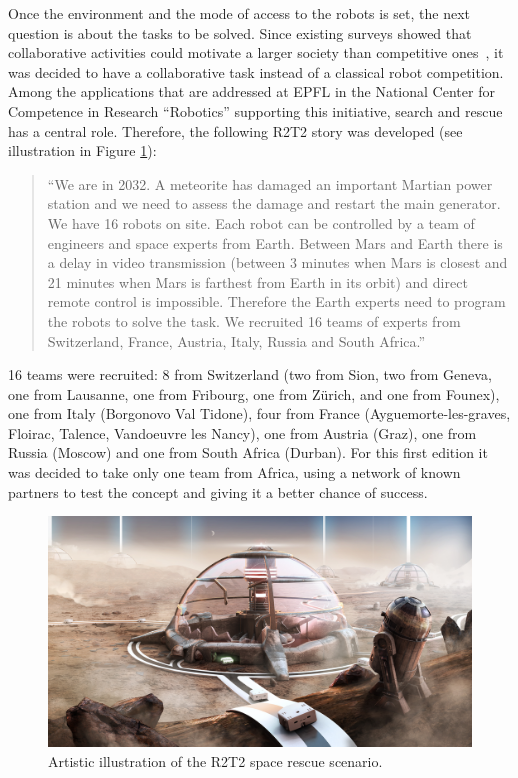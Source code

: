 \documentclass{intech-journal}
\begin{document}
Once the environment and the mode of access to the robots is set, the next question is about the tasks to be solved.
Since existing surveys showed that collaborative activities could motivate a larger society than competitive ones~\cite{riedo2013upgrade}, it was decided to have a collaborative task instead of a classical robot competition. 
Among the applications that are addressed at EPFL in the National Center for Competence in Research ``Robotics'' supporting this initiative, search and rescue has a central role.
Therefore, the following R2T2 story was developed (see illustration in Figure \ref{fig:illustration}):
\begin{quotation}
``We are in 2032. A meteorite has damaged an important Martian power station and we need to assess the damage and restart the main generator. We have 16 robots on site. Each robot can be controlled by a team of engineers and space experts from Earth. Between Mars and Earth there is a delay in video transmission (between 3 minutes when Mars is closest and 21 minutes when Mars is farthest from Earth in its orbit) and direct remote control is impossible. Therefore the Earth experts need to program the robots to solve the task. We recruited 16 teams of experts from Switzerland, France, Austria, Italy, Russia and South Africa.''
\end{quotation}
16 teams were recruited: 8 from Switzerland (two from Sion, two from Geneva, one from Lausanne, one from Fribourg, one from Z\"urich, and one from Founex), one from Italy (Borgonovo Val Tidone), four from France (Ayguemorte-les-graves, Floirac, Talence, Vandoeuvre les Nancy), one from Austria (Graz), one from Russia (Moscow) and one from South Africa (Durban). 
For this first edition it was decided to take only one team from Africa, using a network of known partners to test the concept  and giving it a better chance of success.

\begin{figure}[ht]
 \centering
    \includegraphics[width=0.65\columnwidth]{figures/r2t2_illu.jpg}
  \caption{Artistic illustration of the R2T2 space rescue scenario.}
  \label{fig:illustration} 
\end{figure}
\end{document}
